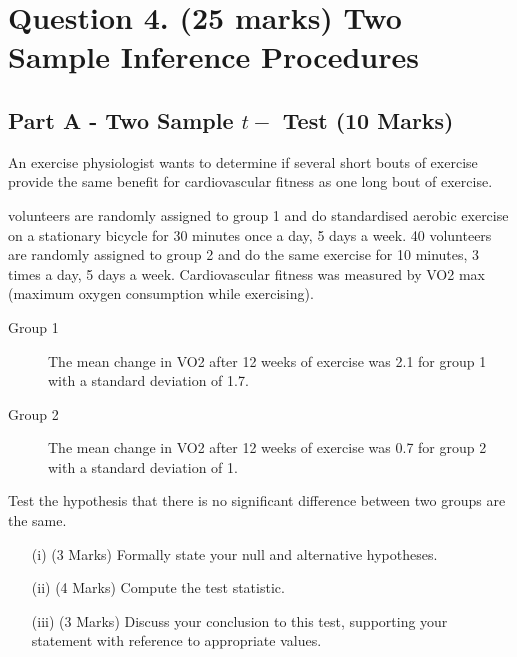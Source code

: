 \documentclass[a4paper,12pt]{article}
\begin{document}
\newpage



\section*{Question 4. (25 marks) Two Sample Inference Procedures}

\subsection*{Part A - Two Sample $t-$ Test (10 Marks)}

An exercise physiologist wants to determine if several short bouts of exercise provide the same benefit for cardiovascular fitness as one long bout of exercise. \\ \smallskip

 volunteers are randomly assigned to group 1 and do standardised aerobic exercise on a stationary bicycle for 30 minutes once a day, 5 days a week. 40 volunteers are randomly assigned to group 2 and do the same exercise for 10 minutes, 3 times a day, 5 days a week. Cardiovascular fitness was measured by VO2 max (maximum oxygen consumption while exercising). 

\begin{description}
	\item[Group 1] The mean change in VO2 after 12 weeks of exercise was 2.1 for group 1 with a standard deviation of 1.7.
	\item[Group 2] The mean change in VO2 after 12 weeks of exercise was 0.7 for group 2 with a standard deviation of 1. 
\end{description}

\noindent Test the hypothesis that there is no significant difference between two groups are the same.

\begin{itemize}
	\item[(i)](3 Marks) Formally state your null and alternative hypotheses.
	\item[(ii)](4 Marks) Compute the test statistic.
	\item[(iii)](3 Marks) Discuss your conclusion to this test, supporting your statement with reference to appropriate values.
\end{itemize}
\end{document}
